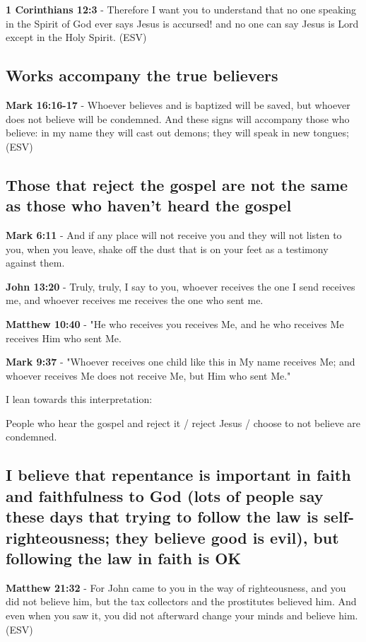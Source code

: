 \documentclass[11pt]{article}
\begin{document}
\textbf{1 Corinthians 12:3} - Therefore I want you to understand that no one speaking in the Spirit of God ever says Jesus is accursed! and no one can say Jesus is Lord except in the Holy Spirit. (ESV)

\subsection{Works accompany the true believers}
\label{sec:org99cd7d9}
\textbf{Mark 16:16-17} - Whoever believes and is baptized will be saved, but whoever does not believe will be condemned. And these signs will accompany those who believe: in my name they will cast out demons; they will speak in new tongues; (ESV)

\subsection{Those that reject the gospel are not the same as those who haven't heard the gospel}
\label{sec:org57633d0}
\textbf{Mark 6:11} - And if any place will not receive you and they will not listen to you, when you leave, shake off the dust that is on your feet as a testimony against them.

\textbf{John 13:20} - Truly, truly, I say to you, whoever receives the one I send receives me, and whoever receives me receives the one who sent me.

\textbf{Matthew 10:40} - "He who receives you receives Me, and he who receives Me receives Him who sent Me.

\textbf{Mark 9:37} - "Whoever receives one child like this in My name receives Me; and whoever receives Me does not receive Me, but Him who sent Me."

I lean towards this interpretation:

People who hear the gospel and reject it / reject Jesus / choose to not believe are condemned.

\subsection{I believe that repentance is important in faith and faithfulness to God (lots of people say these days that trying to follow the law is self-righteousness; they believe good is evil), but following the law in faith is OK}
\label{sec:org12a5190}

\textbf{Matthew 21:32} - For John came to you in the way of righteousness, and you did not believe him, but the tax collectors and the prostitutes believed him. And even when you saw it, you did not afterward change your minds and believe him. (ESV)
\end{document}

